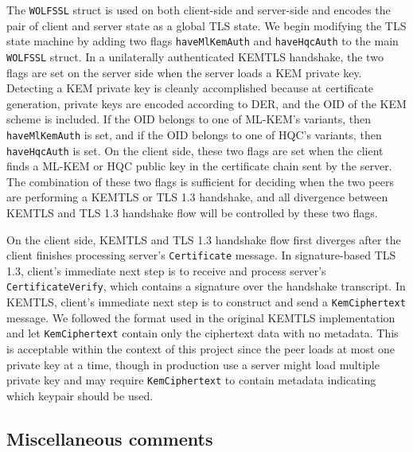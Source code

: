 \documentclass[letterpaper,12pt,titlepage,oneside,final]{book}
\begin{document}
The \texttt{WOLFSSL} struct is used on both client-side and server-side and encodes the pair of client and server state as a global TLS state.
We begin modifying the TLS state machine by adding two flags \texttt{haveMlKemAuth} and \texttt{haveHqcAuth} to the main \texttt{WOLFSSL} struct.
In a unilaterally authenticated KEMTLS handshake, the two flags are set on the server side when the server loads a KEM private key.
Detecting a KEM private key is cleanly accomplished because at certificate generation, private keys are encoded according to DER, and the OID of the KEM scheme is included.
If the OID belongs to one of ML-KEM's variants, then \texttt{haveMlKemAuth} is set, and if the OID belongs to one of HQC's variants, then \texttt{haveHqcAuth} is set.
On the client side, these two flags are set when the client finds a ML-KEM or HQC public key in the certificate chain sent by the server.
The combination of these two flags is sufficient for deciding when the two peers are performing a KEMTLS or TLS 1.3 handshake, and all divergence between KEMTLS and TLS 1.3 handshake flow will be controlled by these two flags.

On the client side, KEMTLS and TLS 1.3 handshake flow first diverges after the client finishes processing server's \texttt{Certificate} message.
In signature-based TLS 1.3, client's immediate next step is to receive and process server's \texttt{CertificateVerify}, which contains a signature over the handshake transcript.
In KEMTLS, client's immediate next step is to construct and send a \texttt{KemCiphertext} message.
We followed the format used in the original KEMTLS implementation and let \texttt{KemCiphertext} contain only the ciphertext data with no metadata.
This is acceptable within the context of this project since the peer loads at most one private key at a time, though in production use a server might load multiple private key and may require \texttt{KemCiphertext} to contain metadata indicating which keypair should be used.

\subsection{Miscellaneous comments}

\end{document}
